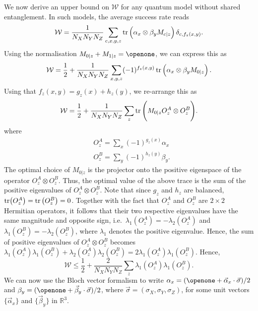 \documentclass[aps,superscriptaddress,twocolumn,twoside,floatfix,pra,nofootinbib,a4paper]{revtex4-2}
\newcommand{\moha}[1]{\textit{\small\textcolor{cyan}{moha: #1}}}
\begin{document}
We now derive an upper bound on $\mathcal{W}$ for any quantum model without shared entanglement. In such models, the average success rate reads
\begin{equation}
\mathcal{W}=\frac{1}{N_XN_YN_Z}\sum_{c,x,y,z}\tr\left(\alpha_x\otimes\beta_y M_{c|z}\right)\delta_{c,f_z(x,y)}.
\end{equation}
Using the normalisation $M_{0|z}+M_{1|z}=\openone$, we can express this as
\begin{equation}
\mathcal{W}=\frac{1}{2}+\frac{1}{N_XN_YN_Z}\sum_{x,y,z}(-1)^{f_z(x,y)}\tr\left(\alpha_x\otimes\beta_y M_{0|z}\right).
\end{equation}
Using that $f_z(x,y)=g_z(x)+ h_z(y)$, we re-arrange this as
\begin{equation}
	\mathcal{W}=\frac{1}{2}+\frac{1}{N_XN_YN_Z}\sum_{z}\tr\Bigg(M_{0|z}O^A_z\otimes O^B_z\Bigg).
 \label{eq: W Oz form}
\end{equation}
where
\begin{align}
&O^A_z=\sum_x (-1)^{g_z(x)}\alpha_x\\
&O^B_z=\sum_y (-1)^{h_z(y)}\beta_y.
\end{align}
The optimal choice of $M_{0|z}$ is the projector onto the positive eigenspace of the operator $O^A_z\otimes O^B_z$. Thus, the optimal value of the above trace is the sum of the positive eigenvalues of $O^A_z\otimes O^B_z$. Note that since $g_z$ and $h_z$ are balanced, $\tr(O^A_z)=\tr\left(O^B_z\right)=0$. Together with the fact that $O^A_z$ and $O^B_z$ are $2\times 2$ Hermitian operators, it follows that their two respective eigenvalues have the same magnitude and opposite sign, i.e.~$\lambda_1(O^A_z)=-\lambda_2(O^A_z)$ and $\lambda_1(O^B_z)=-\lambda_2(O^B_z)$, where $\lambda_1$ denotes the positive eigenvalue. Hence, the sum of positive eigenvalues of $O^A_z\otimes O^B_z$ becomes $\lambda_1(O^A_z)\lambda_1(O^B_z)+\lambda_2(O^A_z)\lambda_2(O^B_z)=2\lambda_1(O^A_z)\lambda_1(O^B_z)$. Hence,
\begin{equation}\nonumber
	\mathcal{W}\leq \frac{1}{2}+\frac{2}{N_XN_YN_Z}\sum_{z}\lambda_1(O^A_z)\lambda_1(O^B_z).
\end{equation}
We can now use the Bloch vector formalism to write $\alpha_x=(\openone+\vec{\alpha}_x\cdot \vec{\sigma})/2$ and $\beta_y=(\openone+\vec{\beta}_y\cdot \vec{\sigma})/2$, where $\vec{\sigma}=(\sigma_X,\sigma_Y,\sigma_Z)$, for some unit vectors $\{\vec{\alpha}_x\}$ and $\{\vec{\beta}_y\}$ in $\mathbb{R}^3$. %
\end{document}
